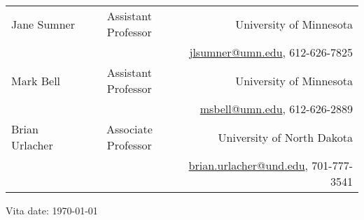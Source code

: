 \documentclass[margin, 10pt]{res} %
\begin{document}
\begin{resume}
\begin{table}[!h]
\begin{footnotesize}
\begin{tabular*}{1\linewidth}{@{\extracolsep{\fill}}lcr}
		Jane Sumner & Assistant Professor & University of Minnesota\\
		& & \textcolor{blue}{\href{mailto:jlsumner@umn.edu}{jlsumner@umn.edu}}, 612-626-7825 \vspace{1.5mm}\\
		
		Mark Bell & Assistant Professor & University of Minnesota\\
		& & \textcolor{blue}{\href{mailto:msbell@umn.edu}{msbell@umn.edu}}, 612-626-2889 \vspace{1.5mm}\\
		 		
		Brian Urlacher & Associate Professor & University of North Dakota\\
		& & \textcolor{blue}{\href{mailto:brian.urlacher@und.edu}{brian.urlacher@und.edu}}, 701-777-3541 \\
	\end{tabular*}
	\end{footnotesize}
\end{table}

\end{resume}

{\vfill Vita date: \today}
\end{document}
